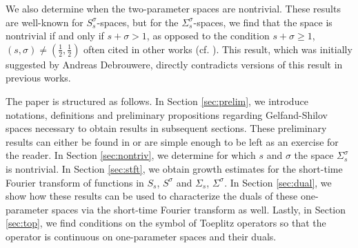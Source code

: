 \documentclass[11pt,a4paper,reqno]{amsart}
\numberwithin{equation}{section}
\theoremstyle{definition}
\theoremstyle{definition}
\begin{document}
We also determine when the two-parameter spaces are nontrivial. These results are well-known for $S_s^\sigma$-spaces, but for the $\Sigma_s^\sigma$-spaces, we find that the space is nontrivial if and only if $s+\sigma > 1$, as opposed to the condition $s+\sigma \geq 1$, $(s,\sigma)\neq (\frac12,\frac12)$ often cited in other works (cf. \cite{toft2}).  This result, which was initially suggested by Andreas Debrouwere, directly contradicts versions of this result in previous works.

The paper is structured as follows. In Section \ref{sec:prelim}, we introduce notations, definitions and preliminary propositions regarding Gelfand-Shilov spaces necessary to obtain results in subsequent sections. These preliminary results can either be found in \cite{chung,eijndhoven,gel} or are simple enough to be left as an exercise for the reader. In Section \ref{sec:nontriv}, we determine for which $s$ and $\sigma$ the space $\Sigma_s^\sigma$ is nontrivial. In Section \ref{sec:stft}, we obtain growth estimates for the short-time Fourier transform of functions in $S_s$, $S^\sigma$ and $\Sigma_s$, $\Sigma^\sigma$. In Section \ref{sec:dual}, we show how these results can be used to characterize the duals of these one-parameter spaces via the short-time Fourier transform as well. Lastly, in Section \ref{sec:top}, we find conditions on the symbol of Toeplitz operators so that the operator is continuous on one-parameter spaces and their duals.

\end{document}
